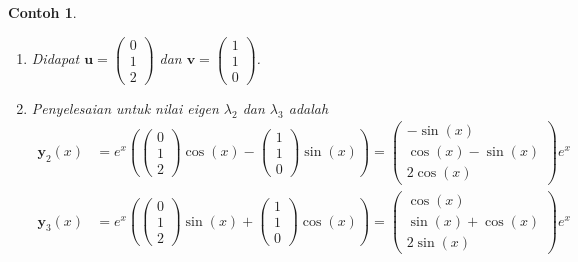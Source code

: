 \documentclass[a4paper]{article}
\theoremstyle{definisi}
\newtheorem{contoh}{Contoh}[section]
\newcommand{\bfxi}{\boldsymbol{\xi}}
\numberwithin{equation}{section}
\begin{document}
\begin{contoh}
\begin{enumerate}[label=Langkah \arabic*: ,leftmargin=*]
      \[\bfxi_2 = \begin{pmatrix}i\\1+i\\2\end{pmatrix}=\begin{pmatrix}0\\1\\2\end{pmatrix}+i\begin{pmatrix}1\\1\\0\end{pmatrix}.\]
      \item Didapat $\mathbf{u}= \begin{pmatrix}0\\1\\2\end{pmatrix}$ dan $\mathbf{v} = \begin{pmatrix}1\\1\\0\end{pmatrix}$.
      \item Penyelesaian untuk nilai eigen $\lambda_2$ dan $\lambda_3$ adalah
      \begin{align*}
        \mathbf{y}_2(x) &= e^{x}\left(\begin{pmatrix}0\\1\\2\end{pmatrix}\cos(x) - \begin{pmatrix}1\\1\\0\end{pmatrix}\sin(x)\right)=\begin{pmatrix}-\sin(x)\\\cos(x)-\sin(x)\\2\cos(x)\end{pmatrix}e^x\\
        \mathbf{y}_3(x) &= e^{x}\left(\begin{pmatrix}0\\1\\2\end{pmatrix}\sin(x) + \begin{pmatrix}1\\1\\0\end{pmatrix}\cos(x)\right)=\begin{pmatrix}\cos(x)\\\sin(x)+\cos(x)\\2\sin(x)\end{pmatrix}e^x

\end{align*}
\end{enumerate}
\end{contoh}
\end{document}
